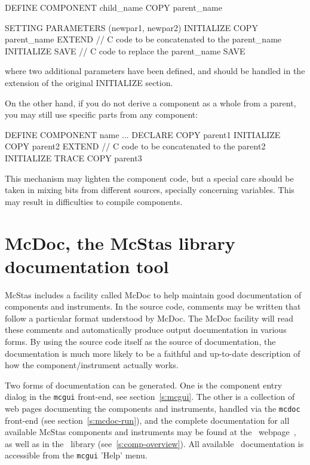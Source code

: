 \begin{mcstas}
DEFINE COMPONENT  child_name COPY parent_name

  SETTING PARAMETERS (newpar1, newpar2) 
  INITIALIZE COPY  parent_name EXTEND 
// C code to be concatenated to the  parent_name INITIALIZE
  SAVE
// C code to replace the  parent_name SAVE 
\end{mcstas}
where two additional parameters have been defined, and should be handled in the
extension of the original INITIALIZE section.

On the other hand, if you do not derive a component as a whole from a parent,
you may still use specific parts from any component:
\begin{mcstas}
DEFINE COMPONENT  name ...
  DECLARE COPY  parent1 
  INITIALIZE COPY  parent2 EXTEND 
// C code to be concatenated to the  parent2 INITIALIZE
TRACE COPY  parent3
\end{mcstas}

This mechanism may lighten the component code, but a special care should be taken in mixing bits from different sources, specially concerning variables. This may result in difficulties to compile components.

\section{McDoc, the McStas library documentation tool}
\label{s:mcdoc}

McStas includes a facility called McDoc to help maintain good documentation of
components and instruments. In the source code, comments may be
written that follow a particular format understood by McDoc. The McDoc facility
will read these comments and automatically produce output documentation in
various forms. By using the source code itself as the source of documentation,
the documentation is much more likely to be a faithful and up-to-date
description of how the component/instrument actually works.

Two forms of documentation can be generated. One
is the component entry dialog in the \verb+mcgui+ front-end, see
section~\ref{s:mcgui}. The other is a collection of web pages documenting
the components and instruments, handled via the \verb+mcdoc+ front-end (see section~\ref{s:mcdoc-run}), and the complete documentation for all available
McStas components and instruments may be found at the \MCS\
webpage~\cite{mcstas_webpage}, as well as in the \MCS\ library
(see~\ref{s:comp-overview}). All available \MCS\ documentation is accessible from the \verb+mcgui+ 'Help' menu.

